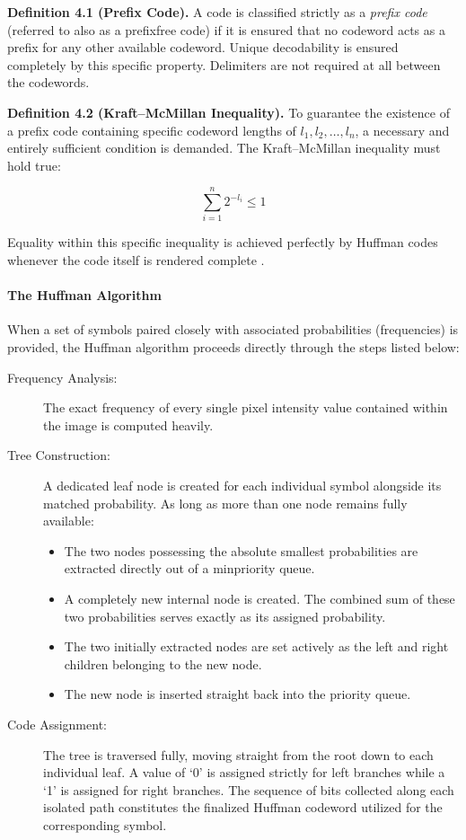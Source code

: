 \vspace{0.5em}\noindent
\textbf{Definition 4.1 (Prefix Code).} A code is classified strictly as a \textit{prefix code} (referred to also as a prefixfree code) if it is ensured that no codeword acts as a prefix for any other available codeword. Unique decodability is ensured completely by this specific property. Delimiters are not required at all between the codewords.

\vspace{0.5em}\noindent
\textbf{Definition 4.2 (Kraft--McMillan Inequality).} To guarantee the existence of a prefix code containing specific codeword lengths of $l_1, l_2, \dots, l_n$, a necessary and entirely sufficient condition is demanded. The Kraft--McMillan inequality must hold true:

\begin{equation}
    \sum_{i=1}^{n} 2^{-l_i} \leq 1 
\end{equation}

Equality within this specific inequality is achieved perfectly by Huffman codes whenever the code itself is rendered complete \cite{Huffman1952}.

\paragraph{The Huffman Algorithm}

When a set of symbols paired closely with associated probabilities (frequencies) is provided, the Huffman algorithm proceeds directly through the steps listed below:

\begin{description}
    \item[Frequency Analysis:] The exact frequency of every single pixel intensity value contained within the image is computed heavily.
    \item[Tree Construction:] A dedicated leaf node is created for each individual symbol alongside its matched probability. As long as more than one node remains fully available:
    \begin{itemize}
        \item The two nodes possessing the absolute smallest probabilities are extracted directly out of a minpriority queue.
        \item A completely new internal node is created. The combined sum of these two probabilities serves exactly as its assigned probability.
        \item The two initially extracted nodes are set actively as the left and right children belonging to the new node.
        \item The new node is inserted straight back into the priority queue.
    \end{itemize}
    \item[Code Assignment:] The tree is traversed fully, moving straight from the root down to each individual leaf. A value of `0' is assigned strictly for left branches while a `1' is assigned for right branches. The sequence of bits collected along each isolated path constitutes the finalized Huffman codeword utilized for the corresponding symbol.
\end{description}

